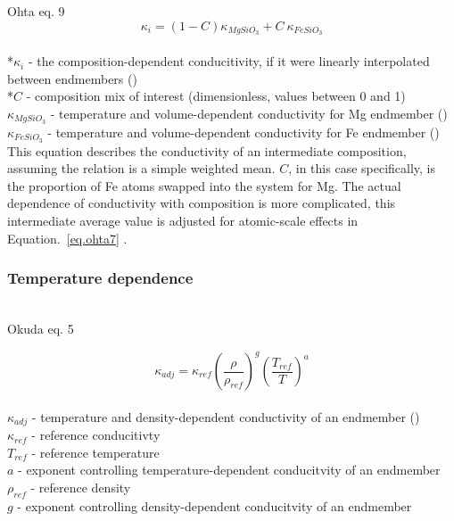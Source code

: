 Ohta eq. 9 
\begin{equation}%
\kappa_{i}=\left ( 1-C \right )\kappa_{MgSiO_{3}}+C\ \kappa_{FeSiO_{3}}
\label{eq.ohta9}
\end{equation}%
\\ *$\kappa_{i}$ - the composition-dependent conducitivity, if it were linearly interpolated between endmembers (\wmk)\\
*$C$ - composition mix of interest (dimensionless, values between 0 and 1)\\
$\kappa_{MgSiO_{3}}$ - temperature and volume-dependent conductivity for Mg endmember (\wmk)\\
$\kappa_{FeSiO_{3}}$ - temperature and volume-dependent conductivity for Fe endmember (\wmk)\\

This equation describes the conductivity of an intermediate composition, assuming the relation is a simple weighted mean. $C$, in this case specifically, is the proportion of Fe atoms swapped into the system for Mg. The actual dependence of conductivity with composition is more complicated, this intermediate average value is adjusted for atomic-scale effects in Equation.~\ref{eq.ohta7} \citep[][Eq. 7]{Ohta2017}. \\

\subsubsection{Temperature dependence}

\cite{Okuda2017}\\

Okuda eq. 5 

\begin{equation}%
\kappa_{adj}=\kappa_{ref}\left ( \frac{\rho}{\rho_{ref}} \right )^{g}\left ( \frac{T_{ref}}{T} \right )^{a}
\label{eq.okuda5}
\end{equation}%
\\ $\kappa_{adj}$ - temperature and density-dependent conductivity of an endmember (\wmk)\\
$\kappa_{ref}$ - reference conducitivty\\
$T_{ref}$ - reference temperature\\
$a$ - exponent controlling temperature-dependent conducitvity of an endmember\\
$\rho_{ref}$ - reference density\\
$g$ - exponent controlling density-dependent conducitvity of an endmember\\

